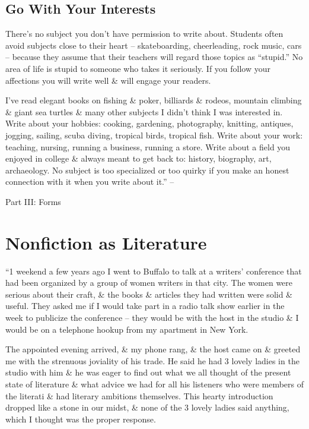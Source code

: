 \documentclass{article}
\begin{document}
\subsection{Go With Your Interests}
There's no subject you don't have permission to write about. Students often avoid subjects close to their heart -- skateboarding, cheerleading, rock music, cars -- because they assume that their teachers will regard those topics as ``stupid.'' No area of life is stupid to someone who takes it seriously. If you follow your affections you will write well \& will engage your readers.

I've read elegant books on fishing \& poker, billiards \& rodeos, mountain climbing \& giant sea  turtles \& many other subjects I didn't think I was interested in. Write about your hobbies: cooking, gardening, photography, knitting, antiques, jogging, sailing, scuba diving, tropical birds, tropical fish. Write about your work: teaching, nursing, running a business, running a store. Write about a field you enjoyed in college \& always meant to get back to: history, biography, art, archaeology. No subject is too specialized or too quirky if you make an honest connection with it when you write about it.'' -- \cite[pp. 69--89]{Zinsser2016}


\begin{center}\huge
	Part III: Forms
\end{center}


\section{Nonfiction as Literature}
``1 weekend a few years ago I went to Buffalo to talk at a writers' conference that had been organized by a group of women writers in that city. The women were serious about their craft, \& the books \& articles they had written were solid \& useful. They asked me if I would take part in a radio talk show earlier in the week to publicize the conference -- they would be with the host in the studio \& I would be on a telephone hookup from my apartment in New York.

The appointed evening arrived, \& my phone rang, \& the host came on \& greeted me with the strenuous joviality of his trade. He said he had 3 lovely ladies in the studio with him \& he was eager to find out what we all thought of the present state of literature \& what advice we had for all his listeners who were members of the literati \& had literary ambitions themselves. This hearty introduction dropped like a stone in our midst, \& none of the 3 lovely ladies said anything, which I thought was the proper response.
\end{document}
